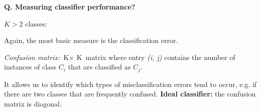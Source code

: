 \begin{frame}[fragile]{\textbf{Q. Measuring classifier performance?}}
  \begin{wideitemize}
  \item $K > 2$ classes:\medskip
    \begin{wideitemize}
    \item Again, the most basic measure is the classification error.
    \item \textit{Confusion matrix:} $\text{K}\times \text{ K}$ matrix where entry \textit{(i, j)} contains the
      number of instances of class $C_i$ that are classified as $C_j$.
    \item {\footnotesize It allows us to identify which types of misclassification errors tend
        to occur, e.g. if there are two classes that are frequently confused.
        \textbf{Ideal classifier:} the confusion matrix is diagonal.}
    \end{wideitemize}
  \end{wideitemize}
\end{frame}


